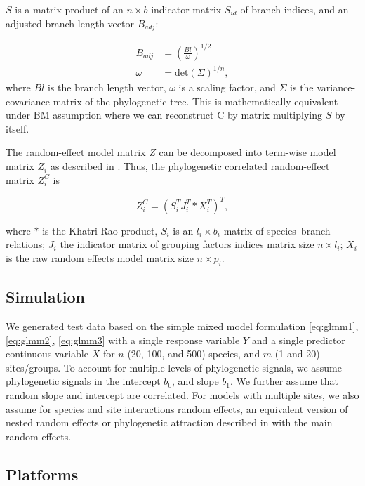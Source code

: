 $S$ is a matrix product of an $n \times b$ indicator matrix $S_{id}$ of branch indices, and an adjusted branch length vector $B_{adj}$:

\begin{align}
B_{adj} & = (\frac{Bl}{\omega})^{1/2} \\
\omega & = \textrm{det}(\Sigma)^{1/n},
\end{align}
where $Bl$ is the branch length vector, $\omega$ is a scaling factor, and $\Sigma$ is the variance-covariance matrix of the phylogenetic tree.
This is mathematically equivalent under BM assumption where we can reconstruct C by matrix multiplying $S$ by itself.

The random-effect model matrix $Z$ can be decomposed into term-wise model matrix $Z_{i}$ as described in \citet{bates2015fitting}.
Thus, the phylogenetic correlated random-effect matrix $Z^{C}_{i}$ is

\begin{equation}
Z^{C}_{i} = (S^{T}_{i}J^{T}_{i} \ast X^{T}_{i})^{T}, \label{eq:ZC}
\end{equation}


where $\ast$ is the Khatri-Rao product, $S_{i}$ is an $l_{i} \times b_{i}$ matrix of species--branch relations; $J_{i}$ the indicator matrix of grouping factors indices matrix size $n \times l_{i}$; $X_{i}$ is the raw random effects model matrix size $n \times p_{i}$. 

\subsection{Simulation}

We generated test data based on the simple mixed model formulation \ref{eq:glmm1}, \ref{eq:glmm2}, \ref{eq:glmm3} with a single response variable $Y$ and a single predictor continuous variable $X$ for $n$ (20, 100, and 500) species, and $m$ (1 and 20) sites/groups. 
To account for multiple levels of phylogenetic signals, we assume phylogenetic signals in the intercept $b_0$, and slope $b_1$.
We further assume that random slope and intercept are correlated. 
For models with multiple sites, we also assume for species and site interactions random effects, an equivalent version of nested random effects or phylogenetic attraction described in \cite{helmus2007separating} with the main random effects.

\subsection{Platforms}

